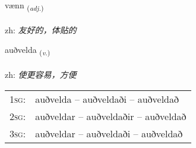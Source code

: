 \documentclass[frontgrid, backgrid]{flacards}\usepackage[]{graphicx}\usepackage[]{color}
\begin{document}
\renewcommand{\flhead}{\vskip5pt \fboxsep=0pt {\small\bfseries\footnotesize Lýsingarorð | 形容词}}
\renewcommand{\fcfoot}{\vskip5pt \fboxsep=0pt \hspace{2pt}{\small\bfseries\footnotesize 2K}}

\renewcommand{\blhead}{\vskip5pt {\small\bfseries\footnotesize Lýsingarorð | 形容词 }}
\renewcommand{\bcfoot}{\vskip5pt \hspace{2pt}{\small\bfseries\footnotesize 2K}}


{vænn \small{\textsubscript{(\textit{adj.})}} \\[1ex] %
\textphonetic{[vaitn̥]} \\
zh: \emph{友好的，体贴的} \\  [2ex]
\renewcommand*{\arraystretch}{0.8}
}

\renewcommand{\flhead}{\vskip5pt \fboxsep=0pt {\small\bfseries\footnotesize Sagnorð | 动词}}
\renewcommand{\fcfoot}{\vskip5pt \fboxsep=0pt \hspace{2pt}{\small\bfseries\footnotesize 2K}}

\renewcommand{\blhead}{\vskip5pt {\small\bfseries\footnotesize Sagnorð | 动词 }}
\renewcommand{\bcfoot}{\vskip5pt \hspace{2pt}{\small\bfseries\footnotesize 2K}}


{auðvelda \small{\textsubscript{(\textit{v.})}} \\[1ex] %
\textphonetic{[œiðvɛlta]} \\
zh: \emph{使更容易，方便} \\  [2ex]
\renewcommand*{\arraystretch}{0.8}
\begin{tabular}{p{1cm}l}
\textsc{1sg}: & auðvelda -- auðveldaði -- auðveldað \\ 
\textsc{2sg}: & auðveldar -- auðveldaðir -- auðveldað \\ 
\textsc{3sg}: & auðveldar -- auðveldaði -- auðveldað \\ 
\end{tabular}
}
\end{document}
